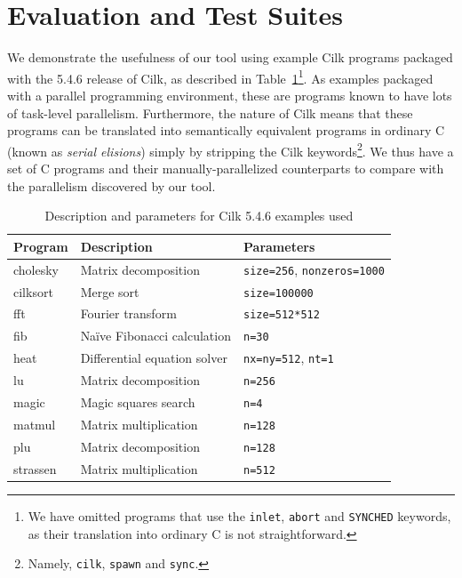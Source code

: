 \section{Evaluation and Test Suites} \label{sresults}

We demonstrate the usefulness of our tool using example Cilk programs packaged with the 5.4.6 release of Cilk,
as described in Table~\ref{cilk-ex}\footnote{We
have omitted programs that use the \texttt{inlet}, \texttt{abort} and \texttt{SYNCHED} keywords,
as their translation into ordinary C is not straightforward.}.
As examples packaged with a parallel programming environment,
these are programs known to have lots of task-level parallelism.
Furthermore, the nature of Cilk means that these programs can be translated into semantically equivalent programs in ordinary C (known as \emph{serial elisions}) simply by stripping the Cilk keywords\footnote{Namely,
\texttt{cilk}, \texttt{spawn} and \texttt{sync}.}.
We thus have a set of C programs and their manually-parallelized counterparts to compare with the parallelism discovered by our tool.

\begin{table}
\centering
\scriptsize
\begin{tabular}{ | l | l | l | }
\hline
Program & Description & Parameters \\
\hline
\textsf{cholesky} & Matrix decomposition & \texttt{size=256}, \texttt{nonzeros=1000} \\
\textsf{cilksort} & Merge sort & \texttt{size=100000} \\
\textsf{fft} & Fourier transform & \texttt{size=512*512} \\
\textsf{fib} & Na\"ive Fibonacci calculation & \texttt{n=30} \\
\textsf{heat} & Differential equation solver & \texttt{nx=ny=512}, \texttt{nt=1} \\ 
\textsf{lu} & Matrix decomposition & \texttt{n=256} \\
\textsf{magic} & Magic squares search & \texttt{n=4} \\
\textsf{matmul} & Matrix multiplication & \texttt{n=128} \\
\textsf{plu} & Matrix decomposition & \texttt{n=128} \\
\textsf{strassen} & Matrix multiplication & \texttt{n=512} \\
\hline
\end{tabular}
\normalsize
\caption{Description and parameters for Cilk 5.4.6 examples used}
\label{cilk-ex}
\end{table}

